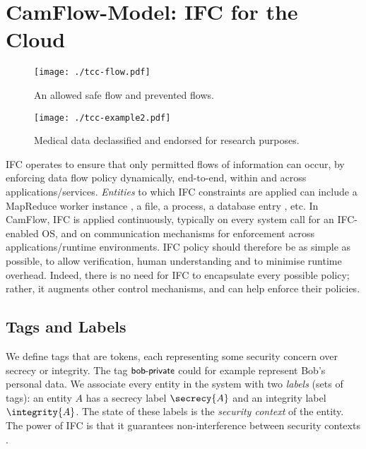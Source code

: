 \documentclass[10pt,journal,compsoc]{IEEEtran}
\begin{document}
 

\section{CamFlow-Model: IFC for the Cloud}
\label{sec:model}


\begin{figure}[!t]
\centering
  \texttt{[image: ./tcc-flow.pdf]}
  \caption{An allowed safe flow and prevented flows.} 
  \label{image:model:flow}
\end{figure}

\begin{figure*}[!t]
\centering
  \texttt{[image: ./tcc-example2.pdf]}
  \caption{Medical data declassified and endorsed for research purposes.}
  \label{image:declass}
\end{figure*} 



IFC operates to ensure that only permitted flows of information can occur, by enforcing data flow policy dynamically, end-to-end, within and across applications\slash services.
\emph{Entities} to which IFC constraints are
applied can include 
a MapReduce worker instance \cite{akoush14mrlazy}, a file, a process, a database entry \cite{Schultz:2013:IDI:2465351.2465357}, etc.
In CamFlow, IFC is applied continuously, typically on every system call for an IFC-enabled OS, and on communication mechanisms for enforcement across applications\slash runtime environments. IFC policy should therefore be as simple as possible, to allow verification, human understanding and to minimise runtime overhead.
Indeed, there is no need for IFC to encapsulate every possible policy; rather, it augments other control mechanisms, and can help enforce their policies.

\subsection{Tags and Labels}
\label{sec:ifc:tags}





We define tags that are tokens, each representing some security concern over secrecy or integrity. The tag $\textsf{\small bob-private}$ could for example represent Bob's personal data. We associate every entity in the system with two {\em labels} (sets of tags): an entity $A$ has a secrecy label $\secrecy{A}$ and an integrity label $\integrity{A}$. The state of these labels is the \emph{security context} of the entity.
The power of IFC is that it guarantees non-interference between security contexts \cite{von2004information, hedin2011perspective}.
\end{document}
